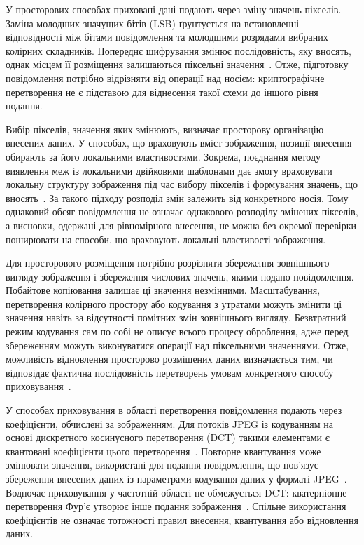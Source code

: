 У просторових способах приховані дані подають через зміну значень пікселів. Заміна молодших значущих бітів (LSB) ґрунтується на встановленні відповідності між бітами повідомлення та молодшими розрядами вибраних колірних складників. Попереднє шифрування змінює послідовність, яку вносять, однак місцем її розміщення залишаються піксельні значення~\cite{alanzy2023lsb}. Отже, підготовку повідомлення потрібно відрізняти від операції над носієм: криптографічне перетворення не є підставою для віднесення такої схеми до іншого рівня подання.

Вибір пікселів, значення яких змінюють, визначає просторову організацію внесених даних. У способах, що враховують вміст зображення, позиції внесення обирають за його локальними властивостями. Зокрема, поєднання методу виявлення меж із локальними двійковими шаблонами дає змогу враховувати локальну структуру зображення під час вибору пікселів і формування значень, що вносять~\cite{sultana2023edge}. За такого підходу розподіл змін залежить від конкретного носія. Тому однаковий обсяг повідомлення не означає однакового розподілу змінених пікселів, а висновки, одержані для рівномірного внесення, не можна без окремої перевірки поширювати на способи, що враховують локальні властивості зображення.

Для просторового розміщення потрібно розрізняти збереження зовнішнього вигляду зображення і збереження числових значень, якими подано повідомлення. Побайтове копіювання залишає ці значення незмінними. Масштабування, перетворення колірного простору або кодування з утратами можуть змінити ці значення навіть за відсутності помітних змін зовнішнього вигляду. Безвтратний режим кодування сам по собі не описує всього процесу оброблення, адже перед збереженням можуть виконуватися операції над піксельними значеннями. Отже, можливість відновлення просторово розміщених даних визначається тим, чи відповідає фактична послідовність перетворень умовам конкретного способу приховування~\cite{muralidharan2022race}.

У способах приховування в області перетворення повідомлення подають через коефіцієнти, обчислені за зображенням. Для потоків JPEG із кодуванням на основі дискретного косинусного перетворення (DCT) такими елементами є квантовані коефіцієнти цього перетворення~\cite{itu1992jpeg}. Повторне квантування може змінювати значення, використані для подання повідомлення, що пов’язує збереження внесених даних із параметрами кодування даних у форматі JPEG~\cite{duan2023jpeg}. Водночас приховування у частотній області не обмежується DCT: кватерніонне перетворення Фур’є утворює інше подання зображення~\cite{parsafar2024qft}. Спільне використання коефіцієнтів не означає тотожності правил внесення, квантування або відновлення даних.

